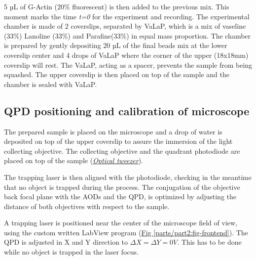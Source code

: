 \documentclass[A4paperpaper,11pt,english]{sphinxmanual}
\begin{document}
5 µL of G-Actin (20\% fluorescent) is then added to the previous mix. This
moment marks the time \emph{t=0} for the experiment and recording. The experimental chamber is
made of 2 coverslips, separated by VaLaP, which is a mix of vaseline (33\%)
Lanoline (33\%) and Parafine(33\%) in equal mass proportion. The chamber is prepared by gently depositing 20 µL of
the final beads mix at the lower coverslip center and 4 drops of VaLaP
where the corner of the upper (18x18mm) coverslip
will rest. The VaLaP, acting as a spacer, prevents the sample from being squashed.  The
upper coverslip is then placed on top of the sample and the chamber is sealed
with VaLaP.


\subsection{QPD positioning and calibration of microscope}
\label{parts/part2:laser-calibration}\label{parts/part2:qpd-positioning-and-calibration-of-microscope}
The prepared sample is placed on the microscope and a drop of water is
deposited on top of the upper coverslip to assure  the immersion of the light
collecting objective. The collecting objective and the quadrant photodiode are
placed on top of the sample ({\hyperref[parts/part1:optical-tweezer]{\emph{Optical tweezer}}}).

The trapping laser is then aligned with the photodiode, checking in the meantime that no
object is trapped during the process. The conjugation of the objective back focal plane
with the AODs and the QPD, is optimized by adjusting the
distance of both objectives with respect to the sample.

A trapping laser is positioned near the center of the microscope field of view,
using the custom written LabView program (\hyperref[parts/part2:fig-frontend]{Fig  \ref*{parts/part2:fig-frontend}}). The QPD is adjusted in X and Y direction to
\(\Delta X  = \Delta Y = 0V\). This has to be  done while no object is trapped in
the  laser focus.
\end{document}
